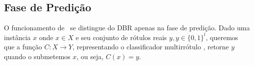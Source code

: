  
%  
%  

 


 
 \subsection{Fase de Predição}
 O funcionamento de \MRLMa~se distingue do DBR apenas na fase de predição.
 Dado uma instância $x$ onde $x\in X$ e seu conjunto de rótulos reais $y,y \in {\{0,1\}}^l$, queremos que a função $C:X\rightarrow Y$,
 representando o classificador multirrótulo \MRLMa, retorne $y$ quando o submetemos $x$, ou seja, $C(x)=y$.
 
